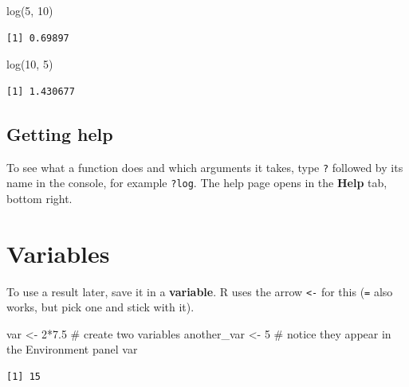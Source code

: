 \documentclass[
  letterpaper,
  DIV=11,
  numbers=noendperiod]{scrreprt}
\newenvironment{Shaded}{\begin{snugshade}}{\end{snugshade}}
\newcommand{\CommentTok}[1]{\textcolor[rgb]{0.37,0.37,0.37}{#1}}
\newcommand{\DecValTok}[1]{\textcolor[rgb]{0.68,0.00,0.00}{#1}}
\newcommand{\FloatTok}[1]{\textcolor[rgb]{0.68,0.00,0.00}{#1}}
\newcommand{\FunctionTok}[1]{\textcolor[rgb]{0.28,0.35,0.67}{#1}}
\newcommand{\NormalTok}[1]{\textcolor[rgb]{0.00,0.23,0.31}{#1}}
\newcommand{\OtherTok}[1]{\textcolor[rgb]{0.00,0.23,0.31}{#1}}
\newcommand{\SpecialCharTok}[1]{\textcolor[rgb]{0.37,0.37,0.37}{#1}}
\begin{document}
\begin{Shaded}
\begin{Highlighting}[]
\FunctionTok{log}\NormalTok{(}\DecValTok{5}\NormalTok{, }\DecValTok{10}\NormalTok{)}
\end{Highlighting}
\end{Shaded}

\begin{verbatim}
[1] 0.69897
\end{verbatim}

\begin{Shaded}
\begin{Highlighting}[]
\FunctionTok{log}\NormalTok{(}\DecValTok{10}\NormalTok{, }\DecValTok{5}\NormalTok{)}
\end{Highlighting}
\end{Shaded}

\begin{verbatim}
[1] 1.430677
\end{verbatim}

\subsection{Getting help}\label{getting-help}

To see what a function does and which arguments it takes, type
\texttt{?} followed by its name in the console, for example
\texttt{?log}. The help page opens in the \textbf{Help} tab, bottom
right.

\section{Variables}\label{variables-1}

To use a result later, save it in a \textbf{variable}. R uses the arrow
\texttt{\textless{}-} for this (\texttt{=} also works, but pick one and
stick with it).

\begin{Shaded}
\begin{Highlighting}[]
\NormalTok{var }\OtherTok{\textless{}{-}} \DecValTok{2}\SpecialCharTok{*}\FloatTok{7.5}       \CommentTok{\# create two variables}
\NormalTok{another\_var }\OtherTok{\textless{}{-}} \DecValTok{5}   \CommentTok{\# notice they appear in the Environment panel}
\NormalTok{var}
\end{Highlighting}
\end{Shaded}

\begin{verbatim}
[1] 15
\end{verbatim}
\end{document}
